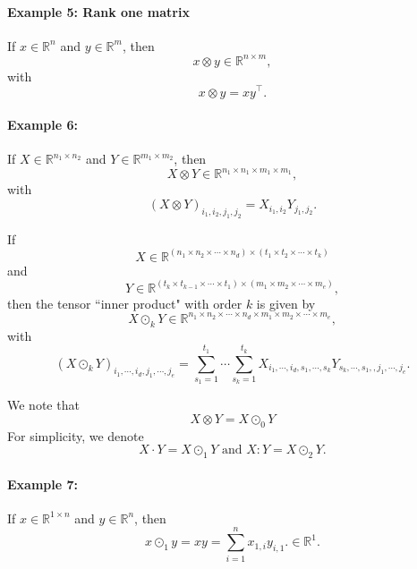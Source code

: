 \paragraph{Example 5: Rank one matrix} If $x \in \mathbb{R}^n$ and $y \in \mathbb{R}^m$, then
\begin{equation}\label{3DColorImage}
x \otimes y \in \mathbb{R}^{n \times m},
\end{equation}
with
\begin{equation}
x \otimes y = x y^\top.
\end{equation}

\paragraph{Example 6: } If $X \in \mathbb{R}^{n_1\times n_2}$ and $Y \in \mathbb{R}^{m_1 \times m_2}$, then
\begin{equation}\label{3DColorImage}
X \otimes Y \in \mathbb{R}^{n_1 \times n_1 \times m_1 \times m_1},
\end{equation}
with
\begin{equation}
(X \otimes Y)_{i_1, i_2, j_1 ,j_2}  =  X_{i_1, i_2} Y_{j_1, j_2}.
\end{equation}

\begin{definition}
If
$$
X \in \mathbb R^{(n_1 \times n_2 \times \cdots \times n_d )\times
  (t_1\times t_2\times\cdots\times t_k)}
$$ and
$$
Y\in \mathbb R^{ (t_k\times t_{k-1}\times\cdots\times t_1)\times
  (m_1 \times m_2 \times \cdots \times m_e)},
$$
then the tensor ``inner product" with order $k$ is given by
\begin{equation}
X\odot_k Y \in \mathbb R^{n_1 \times n_2 \times \cdots \times n_d \times m_1 \times m_2 \times \cdots \times m_e},
\end{equation}
with
\begin{equation}
(X\odot_k Y)_{i_1, \cdots, i_d, j_1, \cdots,j_e}
=\sum_{s_1=1}^{t_1} \cdots\sum_{s_k=1}^{t_k}X_{i_1, \cdots, i_d, s_1,\cdots,s_k} Y_{s_k,\cdots,s_1,,j_1, \cdots, j_e}.
\end{equation}
\end{definition}
We note that
$$
X\otimes Y =X\odot_0Y
$$
For simplicity, we denote
\begin{equation}
X\cdot Y=X\odot_1Y \mbox{ and } X:Y=X\odot_2 Y  .
\end{equation}
\paragraph{Example 7: } If $x \in \mathbb{R}^{1\times n}$ and $y \in \mathbb{R}^{n}$, then
\begin{equation}\label{3DColorImage}
x \odot_1 y =xy= \sum_{i=1}^n x_{1,i} y_{i,1}.\in \mathbb{R}^{1}.
\end{equation}


